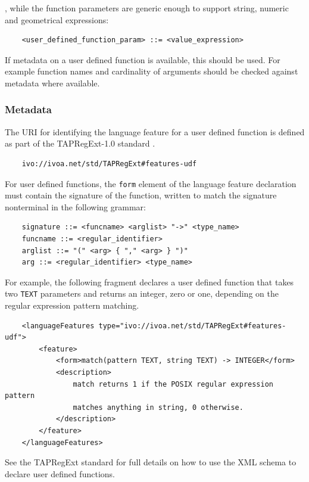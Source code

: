 \documentclass[11pt,a4paper]{ivoa}
\begin{document}
, while the function parameters are generic enough to support string,
numeric and geometrical expressions:

\begin{verbatim}
    <user_defined_function_param> ::= <value_expression>
\end{verbatim}

If metadata on a user defined function is available, this should be used. For
example function names and cardinality of arguments should be checked against
metadata where available.

\subsubsection{Metadata}
\label{sec:user.metadata}

The URI for identifying the language feature for a user defined function
is defined as part of the TAPRegExt-1.0 standard \citep{std:TAPREGEXT}.

\begin{verbatim}
    ivo://ivoa.net/std/TAPRegExt#features-udf
\end{verbatim}

For user defined functions, the \verb:form: element of the language feature
declaration must contain the signature of the function, written to match
the signature nonterminal in the following grammar:

\begin{verbatim}
    signature ::= <funcname> <arglist> "->" <type_name>
    funcname ::= <regular_identifier>
    arglist ::= "(" <arg> { "," <arg> } ")"
    arg ::= <regular_identifier> <type_name>
\end{verbatim}

For example, the following fragment declares a user defined function that
takes two \verb:TEXT: parameters and returns an integer, zero or one,
depending on the regular expression pattern matching.

\begin{verbatim}
    <languageFeatures type="ivo://ivoa.net/std/TAPRegExt#features-udf">
        <feature>
            <form>match(pattern TEXT, string TEXT) -> INTEGER</form>
            <description>
                match returns 1 if the POSIX regular expression pattern
                matches anything in string, 0 otherwise.
            </description>
        </feature>
    </languageFeatures>
\end{verbatim}

See the TAPRegExt standard for full details on how to use the
XML schema to declare user defined functions.
\end{document}
